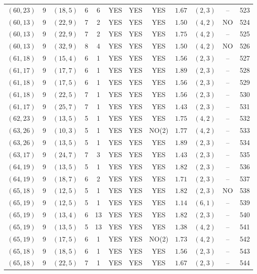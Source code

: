 \begin{longtable}{|c|c|c|c|c|c|c|c|c|c|c|c|}
$(60,23)$ & 9 & $(18,5)$ & 6 & 6 & YES & YES & YES & $1.67$ & $(2,3)$ & -- & 523\\
$(60,13)$ & 9 & $(22,9)$ & 7 & 2 & YES & YES & YES & $1.50$ & $(4,2)$ & NO & 524\\
$(60,13)$ & 9 & $(22,9)$ & 7 & 2 & YES & YES & YES & $1.75$ & $(4,2)$ & -- & 525\\
$(60,13)$ & 9 & $(32,9)$ & 8 & 4 & YES & YES & YES & $1.50$ & $(4,2)$ & NO & 526\\
$(61,18)$ & 9 & $(15,4)$ & 6 & 1 & YES & YES & YES & $1.56$ & $(2,3)$ & -- & 527\\
$(61,17)$ & 9 & $(17,7)$ & 6 & 1 & YES & YES & YES & $1.89$ & $(2,3)$ & -- & 528\\
$(61,18)$ & 9 & $(17,5)$ & 6 & 1 & YES & YES & YES & $1.56$ & $(2,3)$ & -- & 529\\
$(61,18)$ & 9 & $(22,5)$ & 7 & 1 & YES & YES & YES & $1.56$ & $(2,3)$ & -- & 530\\
$(61,17)$ & 9 & $(25,7)$ & 7 & 1 & YES & YES & YES & $1.43$ & $(2,3)$ & -- & 531\\
$(62,23)$ & 9 & $(13,5)$ & 5 & 1 & YES & YES & YES & $1.75$ & $(4,2)$ & -- & 532\\
$(63,26)$ & 9 & $(10,3)$ & 5 & 1 & YES & YES & NO(2) & $1.77$ & $(4,2)$ & -- & 533\\
$(63,26)$ & 9 & $(13,5)$ & 5 & 1 & YES & YES & YES & $1.89$ & $(2,3)$ & -- & 534\\
$(63,17)$ & 9 & $(24,7)$ & 7 & 3 & YES & YES & YES & $1.43$ & $(2,3)$ & -- & 535\\
$(64,19)$ & 9 & $(13,5)$ & 5 & 1 & YES & YES & YES & $1.82$ & $(2,3)$ & -- & 536\\
$(64,19)$ & 9 & $(18,7)$ & 6 & 2 & YES & YES & YES & $1.71$ & $(2,3)$ & -- & 537\\
$(65,18)$ & 9 & $(12,5)$ & 5 & 1 & YES & YES & YES & $1.82$ & $(2,3)$ & NO & 538\\
$(65,19)$ & 9 & $(12,5)$ & 5 & 1 & YES & YES & YES & $1.14$ & $(6,1)$ & -- & 539\\
$(65,19)$ & 9 & $(13,4)$ & 6 & 13 & YES & YES & YES & $1.82$ & $(2,3)$ & -- & 540\\
$(65,19)$ & 9 & $(13,5)$ & 5 & 13 & YES & YES & YES & $1.38$ & $(4,2)$ & -- & 541\\
$(65,19)$ & 9 & $(17,5)$ & 6 & 1 & YES & YES & NO(2) & $1.73$ & $(4,2)$ & -- & 542\\
$(65,18)$ & 9 & $(18,5)$ & 6 & 1 & YES & YES & YES & $1.56$ & $(2,3)$ & -- & 543\\
$(65,18)$ & 9 & $(22,5)$ & 7 & 1 & YES & YES & YES & $1.67$ & $(2,3)$ & -- & 544\\

\end{longtable}
